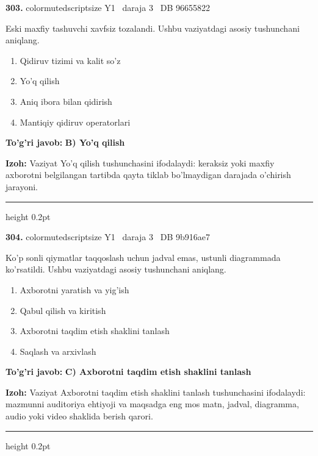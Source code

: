 \documentclass[10pt,a4paper,oneside]{article}
\begin{document}
\noindent\textbf{\color{ink}303.}  {color{muted}scriptsize Y1 \textbullet\ daraja 3 \textbullet\ DB 96655822}
\par
Eski maxfiy tashuvchi xavfsiz tozalandi. Ushbu vaziyatdagi asosiy tushunchani aniqlang.
\begin{enumerate}[label=\Alph*),leftmargin=9mm]
\item Qidiruv tizimi va kalit so'z
\item Yo'q qilish
\item Aniq ibora bilan qidirish
\item Mantiqiy qidiruv operatorlari
\end{enumerate}
\begin{tcolorbox}[enhanced,breakable,colback=teal!4,colframe=teal!50!black,boxrule=0.5pt,arc=1.1mm,left=3mm,right=3mm,top=1.7mm,bottom=1.7mm,before skip=2mm,after skip=2mm]
\textbf{\color{teal}To'g'ri javob:} \textbf{B) Yo'q qilish}
\par\smallskip
\textbf{Izoh:} Vaziyat Yo'q qilish tushunchasini ifodalaydi: keraksiz yoki maxfiy axborotni belgilangan tartibda qayta tiklab bo'lmaydigan darajada o'chirish jarayoni.
\end{tcolorbox}
\vspace{2mm}\hrule height 0.2pt \vspace{3mm}

\noindent\textbf{\color{ink}304.}  {color{muted}scriptsize Y1 \textbullet\ daraja 3 \textbullet\ DB 9b916ae7}
\par
Ko'p sonli qiymatlar taqqoslash uchun jadval emas, ustunli diagrammada ko'rsatildi. Ushbu vaziyatdagi asosiy tushunchani aniqlang.
\begin{enumerate}[label=\Alph*),leftmargin=9mm]
\item Axborotni yaratish va yig'ish
\item Qabul qilish va kiritish
\item Axborotni taqdim etish shaklini tanlash
\item Saqlash va arxivlash
\end{enumerate}
\begin{tcolorbox}[enhanced,breakable,colback=teal!4,colframe=teal!50!black,boxrule=0.5pt,arc=1.1mm,left=3mm,right=3mm,top=1.7mm,bottom=1.7mm,before skip=2mm,after skip=2mm]
\textbf{\color{teal}To'g'ri javob:} \textbf{C) Axborotni taqdim etish shaklini tanlash}
\par\smallskip
\textbf{Izoh:} Vaziyat Axborotni taqdim etish shaklini tanlash tushunchasini ifodalaydi: mazmunni auditoriya ehtiyoji va maqsadga eng mos matn, jadval, diagramma, audio yoki video shaklida berish qarori.
\end{tcolorbox}
\vspace{2mm}\hrule height 0.2pt \vspace{3mm}
\end{document}
